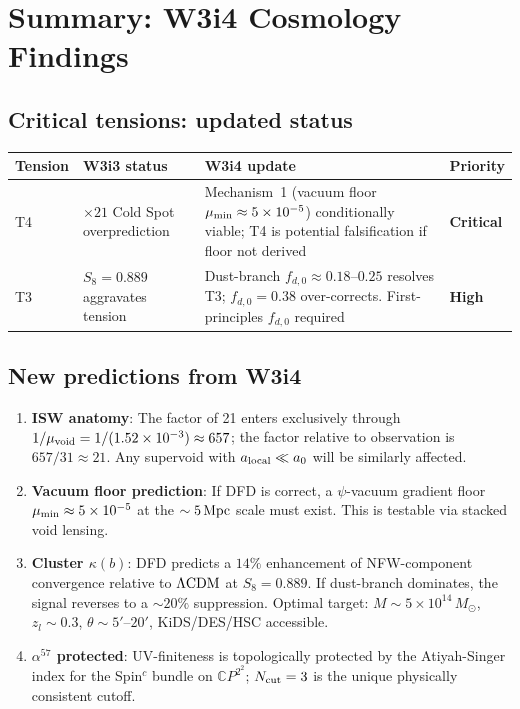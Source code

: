 \documentclass[11pt]{article}
\newcommand{\ee}[1]{\times 10^{#1}}
\newcommand{\CP}{\mathbb{C}P^2}
\newcommand{\mufd}{\mu}
\newcommand{\LCDM}{\Lambda{\rm CDM}}
\newcommand{\mumin}{\mu_{\rm min}}
\begin{document}
\section{Summary: W3i4 Cosmology Findings}
\label{sec:summary}

\subsection{Critical tensions: updated status}

\begin{center}
\begin{tabular}{p{1.5cm}p{4.5cm}p{4.5cm}p{3cm}}
\toprule
Tension & W3i3 status & W3i4 update & Priority \\
\midrule
T4 & $\times 21$ Cold Spot overprediction &
  Mechanism~1 (vacuum floor $\mumin \approx 5\ee{-5}$) conditionally
  viable; T4 is potential falsification if floor not derived &
  \textbf{Critical} \\
T3 & $S_8 = 0.889$ aggravates tension &
  Dust-branch $f_{d,0} \approx 0.18$--$0.25$ resolves T3;
  $f_{d,0} = 0.38$ over-corrects. First-principles $f_{d,0}$ required &
  \textbf{High} \\
\bottomrule
\end{tabular}
\end{center}

\subsection{New predictions from W3i4}

\begin{enumerate}
  \item \textbf{ISW anatomy}: The factor of 21 enters exclusively through
    $1/\mufd_{\rm void} = 1/(1.52\ee{-3}) \approx 657$; the factor relative
    to observation is $657/31 \approx 21$. Any supervoid with $a_{\rm local}
    \ll a_0$ will be similarly affected.

  \item \textbf{Vacuum floor prediction}: If DFD is correct, a $\psi$-vacuum
    gradient floor $\mumin \approx 5\ee{-5}$ at the $\sim 5\,{\rm Mpc}$
    scale must exist.  This is testable via stacked void lensing.

  \item \textbf{Cluster $\kappa(b)$}: DFD predicts a $14\%$ enhancement of
    NFW-component convergence relative to $\LCDM$ at $S_8 = 0.889$.
    If dust-branch dominates, the signal reverses to a $\sim 20\%$ suppression.
    Optimal target: $M \sim 5\ee{14}\,M_\odot$, $z_l \sim 0.3$,
    $\theta \sim 5'$--$20'$, KiDS/DES/HSC accessible.

  \item \textbf{$\alpha^{57}$ protected}: UV-finiteness is topologically
    protected by the Atiyah-Singer index for the Spin$^c$ bundle on $\CP^2$;
    $N_{\rm cut} = 3$ is the unique physically consistent cutoff.
\end{enumerate}
\end{document}

